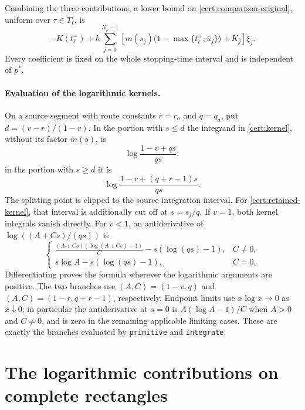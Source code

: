 \documentclass[11pt,a4paper]{article}
\begin{document}
Combining the three contributions, a lower bound on
\eqref{cert:comparison-original}, uniform over $\tau\in T_\ell$, is
\begin{equation}
 -K(t_\ell^-)
 +h\sum_{j=0}^{N_p-1}
 \left[m(s_j)\bigl(1-\max\{t_\ell^+,\overline u_j\}\bigr)+K_j\right]\xi_j.
 \label{cert:comparison-cell-bound}
\end{equation}
Every coefficient is fixed on the whole stopping-time interval and is
independent of $p^*$.

\paragraph{Evaluation of the logarithmic kernels.}
On a source segment with route constants $r=r_a$ and $q=q_a$, put
$d=(v-r)/(1-r)$.  In the portion with $s\leq d$ the integrand in
\eqref{cert:kernel}, without its factor $m(s)$, is
\[
 \log\frac{1-v+qs}{qs};
\]
in the portion with $s\geq d$ it is
\[
 \log\frac{1-r+(q+r-1)s}{qs}.
\]
The splitting point is clipped to the source integration interval.
For \eqref{cert:retained-kernel}, that interval is additionally cut off
at $s=s_j/q$.  If $v=1$, both kernel integrals vanish directly.
For $v<1$, an antiderivative of
$\log((A+Cs)/(qs))$ is
\begin{equation}
 \begin{cases}
 \displaystyle
 \frac{(A+Cs)(\log(A+Cs)-1)}{C}
       -s(\log(qs)-1),& C\ne0,\\[6pt]
 \displaystyle s\log A-s(\log(qs)-1),& C=0.
 \end{cases}
 \label{cert:kernel-antiderivative}
\end{equation}
Differentiating proves the formula wherever the logarithmic arguments
are positive.  The two branches use $(A,C)=(1-v,q)$ and
$(A,C)=(1-r,q+r-1)$, respectively.  Endpoint limits use
$x\log x\to0$ as $x\downarrow0$; in particular the antiderivative at
$s=0$ is $A(\log A-1)/C$ when $A>0$ and $C\ne0$, and is zero in
the remaining applicable limiting cases.  These are exactly the
branches evaluated by \texttt{primitive} and \texttt{integrate}.


\section{The logarithmic contributions on complete rectangles}
\label{sec:release-h-rectangles}
\end{document}
